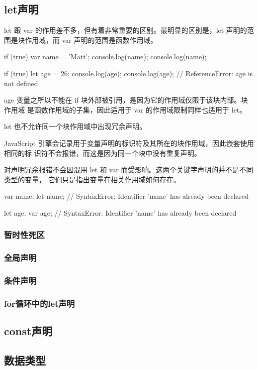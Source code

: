 \subsection{let声明}
let 跟 var 的作用差不多，但有着非常重要的区别。最明显的区别是，let 声明的范围是块作用域，而 var 声明的范围是函数作用域。
\begin{js}
    if (true) {
            var name = 'Matt';
            console.log(name);
        }
    console.log(name);

    if (true) {
            let age = 26;
            console.log(age);
        }
    console.log(age); // ReferenceError: age is not defined
\end{js}

age 变量之所以不能在 if 块外部被引用，是因为它的作用域仅限于该块内部。块作用域
是函数作用域的子集，因此适用于 var 的作用域限制同样也适用于 let。

let 也不允许同一个块作用域中出现冗余声明。

JavaScript 引擎会记录用于变量声明的标识符及其所在的块作用域，因此嵌套使用相同的标
识符不会报错，而这是因为同一个块中没有重复声明。

对声明冗余报错不会因混用 let 和 var 而受影响。这两个关键字声明的并不是不同类型的变量，
它们只是指出变量在相关作用域如何存在。
\begin{js}
    var name;
    let name; // SyntaxError: Identifier 'name' has already been declared

    let age;
    var age; // SyntaxError: Identifier 'name' has already been declared
\end{js}

\subsubsection{暂时性死区}
\subsubsection{全局声明}
\subsubsection{条件声明}
\subsubsection{for循环中的let声明}
\subsection{const声明}
\subsection{数据类型}
